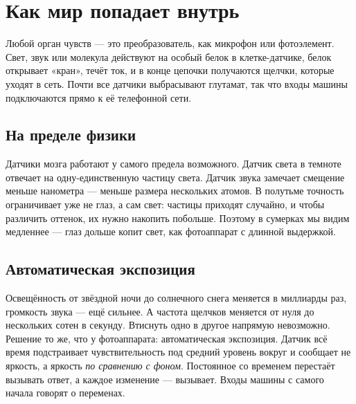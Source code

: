 \chapter{Как мир попадает внутрь}

Любой орган чувств --- это преобразователь, как микрофон или фотоэлемент. Свет, звук или молекула действуют на особый белок в клетке-датчике, белок открывает «кран», течёт ток, и в конце цепочки получаются щелчки, которые уходят в сеть. Почти все датчики выбрасывают глутамат, так что входы машины подключаются прямо к её телефонной сети.

\section*{На пределе физики}

Датчики мозга работают у самого предела возможного. Датчик света в темноте отвечает на одну-единственную частицу света. Датчик звука замечает смещение меньше нанометра --- меньше размера нескольких атомов. В полутьме точность ограничивает уже не глаз, а сам свет: частицы приходят случайно, и чтобы различить оттенок, их нужно накопить побольше. Поэтому в сумерках мы видим медленнее --- глаз дольше копит свет, как фотоаппарат с длинной выдержкой.

\section*{Автоматическая экспозиция}

Освещённость от звёздной ночи до солнечного снега меняется в миллиарды раз, громкость звука --- ещё сильнее. А частота щелчков меняется от нуля до нескольких сотен в секунду. Втиснуть одно в другое напрямую невозможно. Решение то же, что у фотоаппарата: автоматическая экспозиция. Датчик всё время подстраивает чувствительность под средний уровень вокруг и сообщает не яркость, а яркость \emph{по сравнению с фоном}. Постоянное со временем перестаёт вызывать ответ, а каждое изменение --- вызывает. Входы машины с самого начала говорят о переменах.

